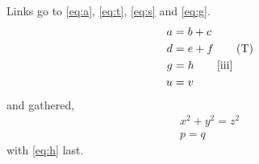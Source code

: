 \documentclass{article}
\begin{document}
Links go to \eqref{eq:a}, \eqref{eq:t}, \ref{eq:s} and \eqref{eq:g}.
\begin{align}
a &= b + c \label{eq:a} \\
d &= e + f \tag{T} \label{eq:t} \\
g &= h \tag*{[iii]} \label{eq:s} \\
u &= v \notag
\end{align}
and gathered,
\begin{gather}
x^2 + y^2 = z^2 \tag{P} \label{eq:g} \\
p = q \label{eq:h}
\end{gather}
with \eqref{eq:h} last.
\end{document}
